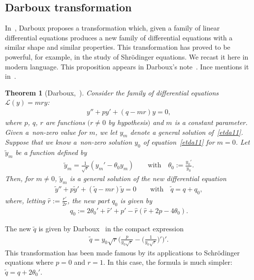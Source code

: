\documentclass[pdftex]{sigma}%
\numberwithin{equation}{section}
\newtheorem{Theorem}{Theorem}[section]
\begin{document}
\subsection{Darboux transformation}
In~\cite{da1}, Darboux proposes a transformation which, given a family of linear differential equations produces a new family of differential equations with a similar shape and similar properties. This transformation has proved to be powerful, for example, in the study of Shr\"odinger equations.
We recast it here in modern language.
This proposition appears in Darboux's note~\cite{da1}.
Ince mentions it in~\cite[p.~132]{in}.

\begin{Theorem}[Darboux,~\cite{da1}]\label{tda1}
Consider the family of differential equations $\mathcal{L}(y)=m r y$:
\begin{gather}\label{etda11}
y''+ py'+(q -mr)y = 0,
\end{gather}
where $p$, $q$, $r$ are functions $(r\neq 0$ by hypothesis$)$ and $m$ is a constant parameter.
Given a~non-zero value for $m$, we let $y_m$ denote a general solution of~\eqref{etda11}.
Suppose that we know a~non-zero solution $y_0$ of equation~\eqref{etda11} for $m=0$.
Let $\tilde{y}_m$ be a function defined by 	
\begin{gather}\label{etda12}
\tilde{y}_m
 = \frac{1}{\sqrt{r}} (y_m'- \theta_0 y_m) \qquad \textrm{with} \quad
 \theta_0:= \frac{y_0'}{y_0}.
 \end{gather}
Then, for $m\neq 0$, $\tilde{y}_m$ is a general solution of the new differential equation
\begin{gather}\label{etda13}
\tilde{y}''+p\tilde{y}'+(\tilde{q}-mr)\tilde{y}=0 \qquad \textrm{with} \quad
\tilde{q} = q + q_0,
\end{gather}
where, letting $\hat{r}:=\frac{r'}{2r}$, the new part $q_0$ is given by
\begin{gather*}%
q_0:= 2 \theta_{{0}}' + \hat{r}' + p'- \hat{r}(\hat{r} + 2 p -4\theta_0).
\end{gather*}
\end{Theorem}

The new $\tilde{q}$ is given by Darboux~\cite{da1} in the compact expression
\begin{gather*}
\tilde{q}=y_0 \sqrt{r}\bigg(\frac{p}{y_0 \sqrt{r}} -\bigg(\frac{1}{y_0 \sqrt{r}}\bigg)'\bigg)'.
\end{gather*}
This transformation has been made famous by its applications to Schr\"odinger equations where $p=0$ and $r=1$. In this case, the formula is much simpler: $\tilde{q}=q+ 2\theta_0'$.
\end{document}

